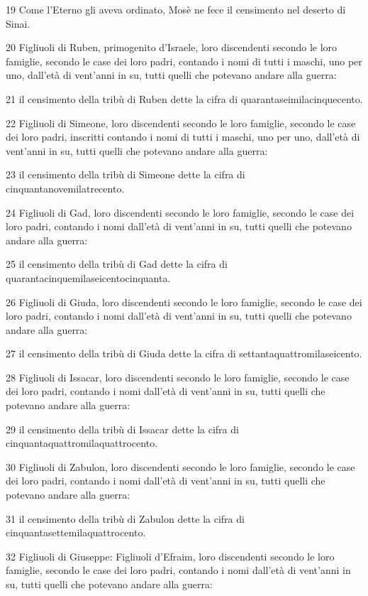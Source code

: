 \par 19 Come l'Eterno gli aveva ordinato, Mosè ne fece il censimento nel deserto di Sinai.
\par 20 Figliuoli di Ruben, primogenito d'Israele, loro discendenti secondo le loro famiglie, secondo le case dei loro padri, contando i nomi di tutti i maschi, uno per uno, dall'età di vent'anni in su, tutti quelli che potevano andare alla guerra:
\par 21 il censimento della tribù di Ruben dette la cifra di quarantaseimilacinquecento.
\par 22 Figliuoli di Simeone, loro discendenti secondo le loro famiglie, secondo le case dei loro padri, inscritti contando i nomi di tutti i maschi, uno per uno, dall'età di vent'anni in su, tutti quelli che potevano andare alla guerra:
\par 23 il censimento della tribù di Simeone dette la cifra di cinquantanovemilatrecento.
\par 24 Figliuoli di Gad, loro discendenti secondo le loro famiglie, secondo le case dei loro padri, contando i nomi dall'età di vent'anni in su, tutti quelli che potevano andare alla guerra:
\par 25 il censimento della tribù di Gad dette la cifra di quarantacinquemilaseicentocinquanta.
\par 26 Figliuoli di Giuda, loro discendenti secondo le loro famiglie, secondo le case dei loro padri, contando i nomi dall'età di vent'anni in su, tutti quelli che potevano andare alla guerra:
\par 27 il censimento della tribù di Giuda dette la cifra di settantaquattromilaseicento.
\par 28 Figliuoli di Issacar, loro discendenti secondo le loro famiglie, secondo le case dei loro padri, contando i nomi dall'età di vent'anni in su, tutti quelli che potevano andare alla guerra:
\par 29 il censimento della tribù di Issacar dette la cifra di cinquantaquattromilaquattrocento.
\par 30 Figliuoli di Zabulon, loro discendenti secondo le loro famiglie, secondo le case dei loro padri, contando i nomi dall'età di vent'anni in su, tutti quelli che potevano andare alla guerra:
\par 31 il censimento della tribù di Zabulon dette la cifra di cinquantasettemilaquattrocento.
\par 32 Figliuoli di Giuseppe: Figliuoli d'Efraim, loro discendenti secondo le loro famiglie, secondo le case dei loro padri, contando i nomi dall'età di vent'anni in su, tutti quelli che potevano andare alla guerra:
